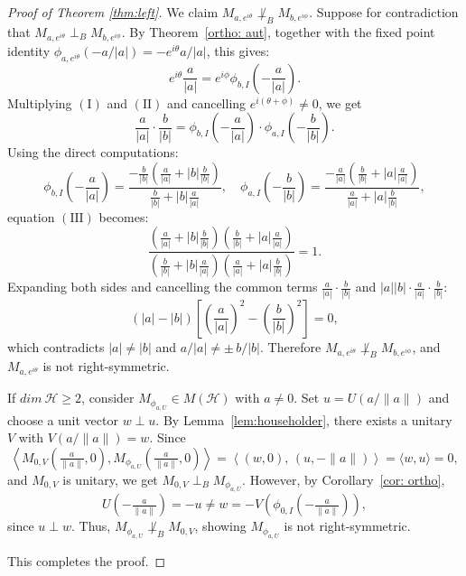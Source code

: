 \documentclass[12pt]{amsart}
\theoremstyle{definition}
\renewcommand{\H}{\mathcal{H}}
\begin{document}
\begin{proof}[Proof of Theorem \ref{thm:left}]
\noindent We claim $M_{a,e^{i\theta}} \not\perp_B 
M_{b,e^{i\phi}}$. Suppose for contradiction that 
$M_{a,e^{i\theta}} \perp_B M_{b,e^{i\phi}}$. By 
Theorem~\ref{ortho: aut}, together with the fixed 
point identity 
$\phi_{a,e^{i\theta}}(-a/|a|) = -e^{i\theta}a/|a|$, 
this gives:
\[
e^{i\theta}\frac{a}{|a|} 
= e^{i\phi}\phi_{b,I}\!\left(-\frac{a}{|a|}\right).
\tag{II}
\]
Multiplying $\mathrm{(I)}$ and $\mathrm{(II)}$ and 
cancelling $e^{i(\theta+\phi)} \neq 0$, we get
\[
\frac{a}{|a|}\cdot\frac{b}{|b|} 
= \phi_{b,I}\!\left(-\frac{a}{|a|}\right)\cdot
\phi_{a,I}\!\left(-\frac{b}{|b|}\right). \tag{III}
\]
Using the direct computations:
\[
\phi_{b,I}\!\left(-\frac{a}{|a|}\right) 
= \frac{-\frac{b}{|b|}\!\left(\frac{a}{|a|}
+|b|\frac{b}{|b|}\right)}{\frac{b}{|b|}
+|b|\frac{a}{|a|}}, \quad
\phi_{a,I}\!\left(-\frac{b}{|b|}\right) 
= \frac{-\frac{a}{|a|}\!\left(\frac{b}{|b|}
+|a|\frac{a}{|a|}\right)}{\frac{a}{|a|}
+|a|\frac{b}{|b|}},
\]
equation $\mathrm{(III)}$ becomes:
\[
\frac{\!\left(\frac{a}{|a|}+|b|\frac{b}{|b|}\right)
\!\left(\frac{b}{|b|}+|a|\frac{a}{|a|}\right)}
{\!\left(\frac{b}{|b|}+|b|\frac{a}{|a|}\right)
\!\left(\frac{a}{|a|}+|a|\frac{b}{|b|}\right)} = 1.
\]
Expanding both sides and cancelling the common terms 
$\frac{a}{|a|}\cdot\frac{b}{|b|}$ and 
$|a||b|\cdot\frac{a}{|a|}\cdot\frac{b}{|b|}$:
\[
(|a|-|b|)\!\left[\left(\frac{a}{|a|}\right)^2 
- \left(\frac{b}{|b|}\right)^2\right] = 0,
\]
which contradicts $|a| \neq |b|$ and 
$a/|a| \neq \pm\, b/|b|$. Therefore 
$M_{a,e^{i\theta}} \not\perp_B M_{b,e^{i\phi}}$, 
and $M_{a,e^{i\theta}}$ is not right-symmetric.


\medskip



\noindent If $dim ~\H \geq 2$, consider $M_{\phi_{a,U}} \in M(\mathcal{H})$ with $a \neq 0$. 
Set $u = U\!\left(a/\|a\|\right)$ and choose a unit 
vector $w \perp u$. By Lemma~\ref{lem:householder}, there exists 
a unitary $V$ with $V\!\left(a/\|a\|\right) = w$. Since
\[
\left\langle M_{0,V}\!\left(\tfrac{a}{\|a\|},0\right), 
M_{\phi_{a,U}}\!\left(\tfrac{a}{\|a\|},0\right)\right\rangle 
= \left\langle (w,0),\, (u, -\|a\|)\right\rangle 
= \langle w, u\rangle = 0,
\]
and $M_{0,V}$ is unitary, we get $M_{0,V} \perp_B M_{\phi_{a,U}}$. 
However, by Corollary~\ref{cor: ortho},
\[
U\!\left(-\tfrac{a}{\|a\|}\right) = -u \neq w 
=- V\!\left(\phi_{0,I}\!\left(-\tfrac{a}{\|a\|}\right)\right),
\]
since $u \perp w$. Thus, $M_{\phi_{a,U}} \not\perp_B M_{0,V}$, showing $M_{\phi_{a,U}}$ is not 
right-symmetric.

\medskip

\noindent This completes the proof.
\end{proof}
\end{document}
